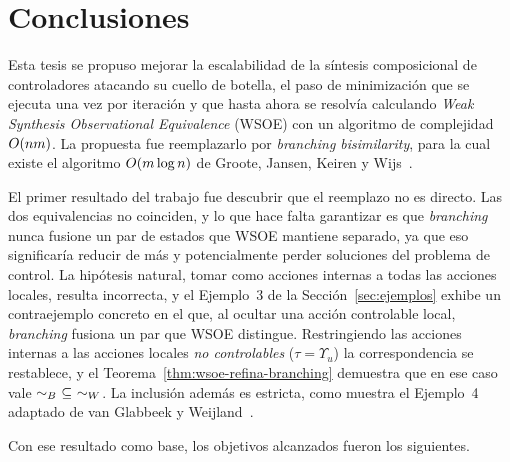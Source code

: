 \chapter{Conclusiones}
\label{cap:conclusiones}

Esta tesis se propuso mejorar la escalabilidad de la síntesis composicional de controladores
atacando su cuello de botella, el paso de minimización que se ejecuta una vez por iteración y
que hasta ahora se resolvía calculando \textit{Weak Synthesis Observational Equivalence} (WSOE)
con un algoritmo de complejidad ${O\!\left(nm\right)}$. La propuesta fue reemplazarlo por
\textit{branching bisimilarity}, para la cual existe el algoritmo ${O\!\left(m \log n\right)}$ de Groote,
Jansen, Keiren y Wijs~\cite{groote2019}.

El primer resultado del trabajo fue descubrir que el reemplazo no es directo. Las dos
equivalencias no coinciden, y lo que hace falta garantizar es que
\textit{branching} nunca fusione un par de estados que WSOE mantiene separado, ya que eso
significaría reducir de más y potencialmente perder soluciones del problema de control. La
hipótesis natural, tomar como acciones internas a todas las acciones locales, resulta
incorrecta, y el Ejemplo~3 de la Sección~\ref{sec:ejemplos} exhibe un contraejemplo concreto
en el que, al ocultar una acción controlable local, \textit{branching} fusiona un par que
WSOE distingue.
Restringiendo las acciones internas a las acciones locales \textit{no controlables}
($\tau = \Upsilon_u$) la correspondencia se restablece, y el
Teorema~\ref{thm:wsoe-refina-branching} demuestra que en ese caso vale
$\sim_{B} \ \subseteq \ \sim_{W}$. La inclusión además es estricta, como muestra el Ejemplo~4 adaptado
de van Glabbeek y Weijland~\cite{glabbeek1996}.

\vspace{.5cm}
Con ese resultado como base, los objetivos alcanzados fueron los siguientes.

